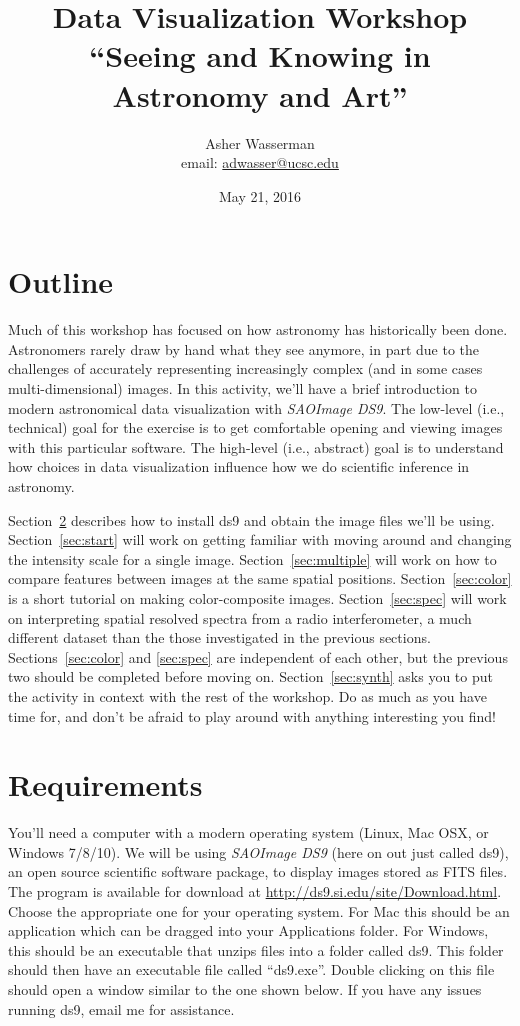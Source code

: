 \documentclass[12pt]{article}
\title{Data Visualization Workshop \\ ``Seeing and Knowing in Astronomy and Art''}
\author{Asher Wasserman \\ email: \href{mailto:adwasser@ucsc.edu}{adwasser@ucsc.edu}}
\date{May 21, 2016}
\begin{document}
\maketitle

\section{Outline}
\label{sec:outline}
Much of this workshop has focused on how astronomy has historically been done.  Astronomers rarely draw by hand what they see anymore, in part due to the challenges of accurately representing increasingly complex (and in some cases multi-dimensional) images.  In this activity, we'll have a brief introduction to modern astronomical data visualization with \emph{SAOImage DS9}.  The low-level (i.e., technical) goal for the exercise is to get comfortable opening and viewing images with this particular software.  The high-level (i.e., abstract) goal is to understand how choices in data visualization influence how we do scientific inference in astronomy.

Section~\ref{sec:req} describes how to install ds9 and obtain the image files we'll be using.  Section~\ref{sec:start} will work on getting familiar with moving around and changing the intensity scale for a single image.  Section~\ref{sec:multiple} will work on how to compare features between images at the same spatial positions.  Section~\ref{sec:color} is a short tutorial on making color-composite images.  Section~\ref{sec:spec} will work on interpreting spatial resolved spectra from a radio interferometer, a much different dataset than the those investigated in the previous sections.  Sections~\ref{sec:color} and \ref{sec:spec} are independent of each other, but the previous two should be completed before moving on.  Section~\ref{sec:synth} asks you to put the activity in context with the rest of the workshop.  Do as much as you have time for, and don't be afraid to play around with anything interesting you find!

\section{Requirements}
\label{sec:req}

You'll need a computer with a modern operating system (Linux, Mac OSX, or Windows 7/8/10).  We will
be using \emph{SAOImage DS9} (here on out just called ds9), an open source scientific software package, 
to display images stored as FITS files.  The program is available for download at \url{http://ds9.si.edu/site/Download.html}.  Choose the appropriate one for your operating system.  For Mac this should be an application which can be dragged into your Applications folder.  For Windows, this should be an executable that unzips files into a folder called ds9.  This folder should then have an executable file called ``ds9.exe''.  Double clicking on this file should open a window similar to the one shown below.  If you have any issues running ds9, email me for assistance.
\end{document}
